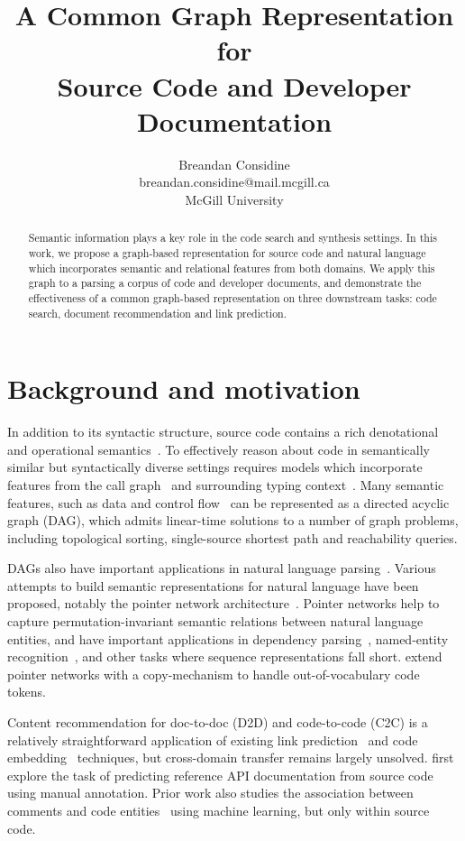 \documentclass{article}
\title{A Common Graph Representation for\\Source Code and Developer Documentation}
\author{Breandan Considine\\
breandan.considine@mail.mcgill.ca\\
McGill University}
\begin{document}
\maketitle

\begin{abstract}
Semantic information plays a key role in the code search and synthesis settings. In this work, we propose a graph-based representation for source code and natural language which incorporates semantic and relational features from both domains. We apply this graph to a parsing a corpus of code and developer documents, and demonstrate the effectiveness of a common graph-based representation on three downstream tasks: code search, document recommendation and link prediction.
\end{abstract}

\section{Background and motivation}

In addition to its syntactic structure, source code contains a rich denotational and operational semantics~\citep{henkel2018code}. To effectively reason about code in semantically similar but syntactically diverse settings requires models which incorporate features from the call graph~\citep{gu2016deep, 10.1145/3361242.3362774} and surrounding typing context~\citep{allamanis2017learning}. Many semantic features, such as data and control flow~\citep{si2018learning} can be represented as a directed acyclic graph (DAG), which admits linear-time solutions to a number of graph problems, including topological sorting, single-source shortest path and reachability queries.

DAGs also have important applications in natural language parsing~\citep{sagae2008shift, quernheim2012dagger}. Various attempts to build semantic representations for natural language have been proposed, notably the pointer network architecture~\citep{vinyals2015pointer, vinyals2015order}. Pointer networks help to capture permutation-invariant semantic relations between natural language entities, and have important applications in dependency parsing~\citep{ma2018stack}, named-entity recognition~\citep{lample2016neural}, and other tasks where sequence representations fall short. \citet{li2017code} extend pointer networks with a copy-mechanism to handle out-of-vocabulary code tokens.

Content recommendation for doc-to-doc (D2D) and code-to-code (C2C) is a relatively straightforward application of existing link prediction~\citep{zhang2018link} and code embedding~\citep{gu2018deep} techniques, but cross-domain transfer remains largely unsolved. \citet{robillard2015recommending, robillard2017demand} first explore the task of predicting reference API documentation from source code using manual annotation. Prior work also studies the association between comments and code entities~\citep{panthaplackel2020associating} using machine learning, but only within source code.
\end{document}
